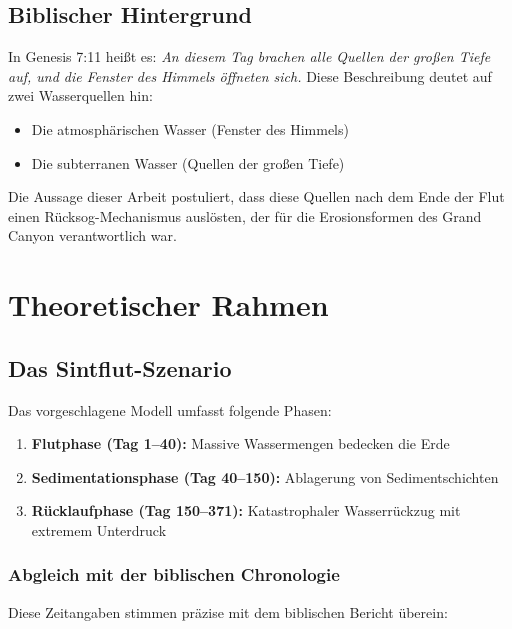 ﻿\documentclass[12pt,a4paper]{report}
\begin{document}
\section{Biblischer Hintergrund}

In Genesis 7:11 heißt es: \textit{An diesem Tag brachen alle Quellen der großen Tiefe auf, und die Fenster des Himmels öffneten sich.} Diese Beschreibung deutet auf zwei Wasserquellen hin:

\begin{itemize}
	\item Die atmosphärischen Wasser (Fenster des Himmels)
	\item Die subterranen Wasser (Quellen der großen Tiefe)
\end{itemize}

Die Aussage dieser Arbeit postuliert, dass diese Quellen nach dem Ende der Flut einen Rücksog-Mechanismus auslösten, der für die Erosionsformen des Grand Canyon verantwortlich war.

\chapter{Theoretischer Rahmen}

\section{Das Sintflut-Szenario}

Das vorgeschlagene Modell umfasst folgende Phasen:

\begin{enumerate}
	\item \textbf{Flutphase (Tag 1--40):} Massive Wassermengen bedecken die Erde
	\item \textbf{Sedimentationsphase (Tag 40--150):} Ablagerung von Sedimentschichten
	\item \textbf{Rücklaufphase (Tag 150--371):} Katastrophaler Wasserrückzug mit extremem Unterdruck
\end{enumerate}

\subsection{Abgleich mit der biblischen Chronologie}

Diese Zeitangaben stimmen präzise mit dem biblischen Bericht überein:
\end{document}
